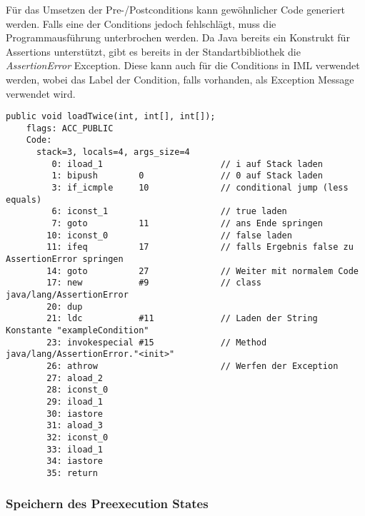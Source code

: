 Für das Umsetzen der Pre-/Postconditions kann gewöhnlicher Code generiert werden. Falls eine der Conditions
jedoch fehlschlägt, muss die Programmausführung unterbrochen werden. Da Java bereits ein Konstrukt für 
Assertions unterstützt, gibt es bereits in der Standartbibliothek die \textit{AssertionError} Exception.
Diese kann auch für die Conditions in IML verwendet werden, wobei das Label der Condition, falls vorhanden,
als Exception Message verwendet wird.
\newline

\begin{lstlisting}[caption=Bytecode der loadTwice Prozedur mit precondition,label={lst:loadtwice_code_precond}]
public void loadTwice(int, int[], int[]);
    flags: ACC_PUBLIC
    Code:
      stack=3, locals=4, args_size=4
         0: iload_1                       // i auf Stack laden
         1: bipush        0               // 0 auf Stack laden
         3: if_icmple     10              // conditional jump (less equals)
         6: iconst_1                      // true laden
         7: goto          11              // ans Ende springen
        10: iconst_0                      // false laden
        11: ifeq          17              // falls Ergebnis false zu AssertionError springen
        14: goto          27              // Weiter mit normalem Code
        17: new           #9              // class java/lang/AssertionError
        20: dup         
        21: ldc           #11             // Laden der String Konstante "exampleCondition"
        23: invokespecial #15             // Method java/lang/AssertionError."<init>"
        26: athrow                        // Werfen der Exception
        27: aload_2       
        28: iconst_0      
        29: iload_1       
        30: iastore       
        31: aload_3       
        32: iconst_0      
        33: iload_1       
        34: iastore       
        35: return  
\end{lstlisting}

\subsubsection{Speichern des Preexecution States}

